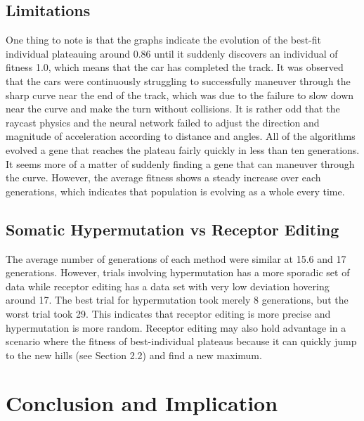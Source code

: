 \documentclass[]{interact}
\theoremstyle{plain} %
\theoremstyle{definition}
\theoremstyle{remark}
\begin{document}
\subsection{Limitations}
One thing to note is that the graphs indicate the evolution of the best-fit individual plateauing around 0.86 until it suddenly discovers an individual of fitness 1.0, which means that the car has completed the track. It was observed that the cars were continuously struggling to successfully maneuver through the sharp curve near the end of the track, which was due to the failure to slow down near the curve and make the turn without collisions. It is rather odd that the raycast physics and the neural network failed to adjust the direction and magnitude of acceleration according to distance and angles. All of the algorithms evolved a gene that reaches the plateau fairly quickly in less than ten generations. It seems more of a matter of suddenly finding a gene that can maneuver through the curve. However, the average fitness shows a steady increase over each generations, which indicates that population is evolving as a whole every time.

\subsection{Somatic Hypermutation vs Receptor Editing}
The average number of generations of each method were similar at 15.6 and 17 generations. However, trials involving hypermutation has a more sporadic set of data while receptor editing has a data set with very low deviation hovering around 17. The best trial for hypermutation took merely 8 generations, but the worst trial took 29. This indicates that receptor editing is more precise and hypermutation is more random. Receptor editing may also hold advantage in a scenario where the fitness of best-individual plateaus because it can quickly jump to the new hills (see Section 2.2) and find a new maximum.

\section{Conclusion and Implication}
\end{document}
